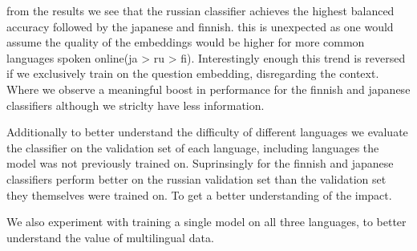 \documentclass[11pt]{article}
\begin{document}
from the results we see that the russian classifier achieves the highest balanced accuracy followed by the japanese and finnish.
this is unexpected as one would assume the quality of the embeddings would be higher for more common languages spoken online(ja > ru > fi).
Interestingly enough this trend is reversed if we exclusively train on the question embedding, disregarding the context. 
Where we observe a meaningful boost in performance for the finnish and japanese classifiers although we striclty have less information.

Additionally to better understand the difficulty of different languages we evaluate the classifier on the validation set of each language, including languages the model was not previously trained on.
Suprinsingly for the finnish and japanese classifiers perform better on the russian validation set than the validation set they themselves were trained on.
To get a better understanding of the impact. 


We also experiment with training a single model on all three languages, to better understand the value of multilingual data.

\begin{table}[ht]
    \centering
    \caption{Model performance for language-specific and combined training, with and without context}
    \label{tab:model_performance}
\end{table}
\end{document}
